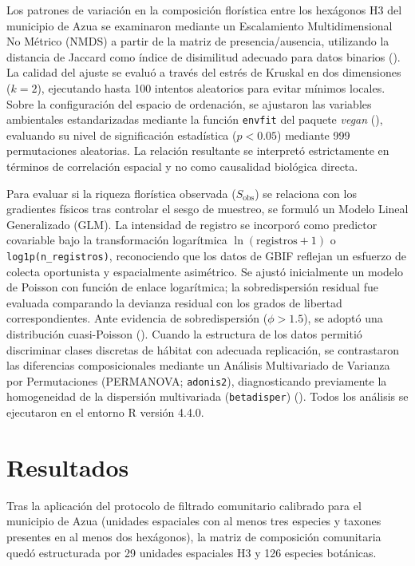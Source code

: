 \documentclass[
  12pt,
  man,
  floatsintext]{apa7}
\begin{document}
Los patrones de variación en la composición florística entre los hexágonos H3 del municipio de Azua se examinaron mediante un Escalamiento Multidimensional No Métrico (NMDS) a partir de la matriz de presencia/ausencia, utilizando la distancia de Jaccard como índice de disimilitud adecuado para datos binarios (). La calidad del ajuste se evaluó a través del estrés de Kruskal en dos dimensiones (\(k = 2\)), ejecutando hasta 100 intentos aleatorios para evitar mínimos locales. Sobre la configuración del espacio de ordenación, se ajustaron las variables ambientales estandarizadas mediante la función \texttt{envfit} del paquete \emph{vegan} (), evaluando su nivel de significación estadística (\(p < 0.05\)) mediante 999 permutaciones aleatorias. La relación resultante se interpretó estrictamente en términos de correlación espacial y no como causalidad biológica directa.

Para evaluar si la riqueza florística observada (\(S_{\text{obs}}\)) se relaciona con los gradientes físicos tras controlar el sesgo de muestreo, se formuló un Modelo Lineal Generalizado (GLM). La intensidad de registro se incorporó como predictor covariable bajo la transformación logarítmica \(\ln(\text{registros} + 1)\) o \texttt{log1p(n\_registros)}, reconociendo que los datos de GBIF reflejan un esfuerzo de colecta oportunista y espacialmente asimétrico. Se ajustó inicialmente un modelo de Poisson con función de enlace logarítmica; la sobredispersión residual fue evaluada comparando la devianza residual con los grados de libertad correspondientes. Ante evidencia de sobredispersión (\(\phi > 1.5\)), se adoptó una distribución cuasi-Poisson (). Cuando la estructura de los datos permitió discriminar clases discretas de hábitat con adecuada replicación, se contrastaron las diferencias composicionales mediante un Análisis Multivariado de Varianza por Permutaciones (PERMANOVA; \texttt{adonis2}), diagnosticando previamente la homogeneidad de la dispersión multivariada (\texttt{betadisper}) (). Todos los análisis se ejecutaron en el entorno R versión 4.4.0.

\section{Resultados}\label{resultados}

Tras la aplicación del protocolo de filtrado comunitario calibrado para el municipio de Azua (unidades espaciales con al menos tres especies y taxones presentes en al menos dos hexágonos), la matriz de composición comunitaria quedó estructurada por 29 unidades espaciales H3 y 126 especies botánicas.
\end{document}
